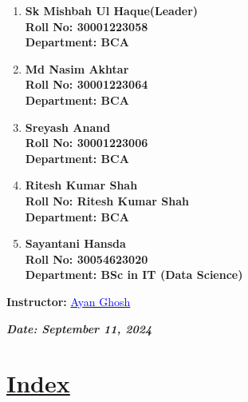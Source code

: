 \documentclass[a4paper,12pt]{article}
\begin{document}
\begin{titlepage}
    \normalsize
    \begin{enumerate}
        \item \textbf{Sk Mishbah Ul Haque(Leader)}\\
              \textbf{Roll No: 30001223058}\\
              \textbf{Department: BCA}
        \item \textbf{Md Nasim Akhtar}\\
              \textbf{Roll No: 30001223064}\\
              \textbf{Department: BCA}
        \item \textbf{Sreyash Anand}\\
              \textbf{Roll No: 30001223006}\\
              \textbf{Department: BCA}
        \item \textbf{Ritesh Kumar Shah}\\
              \textbf{Roll No: Ritesh Kumar Shah}\\
              \textbf{Department: BCA}
        \item \textbf{Sayantani Hansda}\\
              \textbf{Roll No: 30054623020}\\
              \textbf{Department: BSc in IT (Data Science)}
    \end{enumerate}
    \vspace{0.8 cm}
    
    \textbf{Instructor:} \href{mailto:ayan.ghosh@university.edu}{\textcolor{blue}{Ayan Ghosh}}\\
    \vspace{0.2cm}
    
    \textbf{\textit{Date: September 11, 2024}}

\end{titlepage}
\newpage
{}
\vspace{-2cm}

\centering
\section*{\underline{\Huge\textbf{\textcolor{blue!60}{Index}}}}
\vspace{0.5cm}
\end{document}
